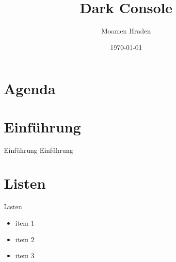 \documentclass{beamer}
\title{Dark Console}
\author{Moamen Hraden}
\date{\today}
\begin{document}
\begin{frame}
    \maketitle
\end{frame}

\section{Agenda}
\begin{frame}
    \tableofcontents
\end{frame}


\section{Einführung}
\begin{frame}{Einführung}
    Einführung
\end{frame}


\section{Listen}
\begin{frame}{Listen}
    \begin{itemize}
        \item item 1
        \item item 2
        \item item 3
    \end{itemize}
\end{frame}
\end{document}
